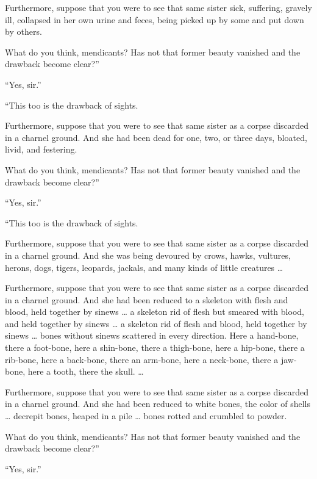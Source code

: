 \documentclass[12pt,openany]{book}%
\begin{document}
Furthermore, suppose that you were to see that same sister sick, suffering, gravely ill, collapsed in her own urine and feces, being picked up by some and put down by others. 

What do you think, mendicants? Has not that former beauty vanished and the drawback become clear?” 

“Yes, sir.” 

“This too is the drawback of sights. 

Furthermore, suppose that you were to see that same sister as a corpse discarded in a charnel ground. And she had been dead for one, two, or three days, bloated, livid, and festering. 

What do you think, mendicants? Has not that former beauty vanished and the drawback become clear?” 

“Yes, sir.” 

“This too is the drawback of sights. 

Furthermore, suppose that you were to see that same sister as a corpse discarded in a charnel ground. And she was being devoured by crows, hawks, vultures, herons, dogs, tigers, leopards, jackals, and many kinds of little creatures … 

Furthermore, suppose that you were to see that same sister as a corpse discarded in a charnel ground. And she had been reduced to a skeleton with flesh and blood, held together by sinews … a skeleton rid of flesh but smeared with blood, and held together by sinews … a skeleton rid of flesh and blood, held together by sinews … bones without sinews scattered in every direction. Here a hand-bone, there a foot-bone, here a shin-bone, there a thigh-bone, here a hip-bone, there a rib-bone, here a back-bone, there an arm-bone, here a neck-bone, there a jaw-bone, here a tooth, there the skull. … 

Furthermore, suppose that you were to see that same sister as a corpse discarded in a charnel ground. And she had been reduced to white bones, the color of shells … decrepit bones, heaped in a pile … bones rotted and crumbled to powder. 

What do you think, mendicants? Has not that former beauty vanished and the drawback become clear?” 

“Yes, sir.” 
\end{document}
